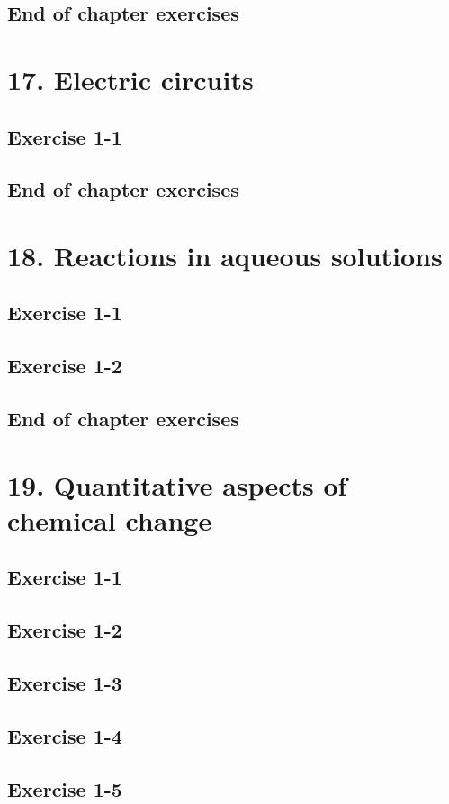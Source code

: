 \subsection{End of chapter exercises}
\section{17. Electric circuits}
\subsection{Exercise 1-1}
\subsection{End of chapter exercises}
\section{18. Reactions in aqueous solutions}
\subsection{Exercise 1-1}
\subsection{Exercise 1-2}
\subsection{End of chapter exercises}
\section{19. Quantitative aspects of chemical change}
\subsection{Exercise 1-1}
\subsection{Exercise 1-2}
\subsection{Exercise 1-3}
\subsection{Exercise 1-4}
\subsection{Exercise 1-5}
